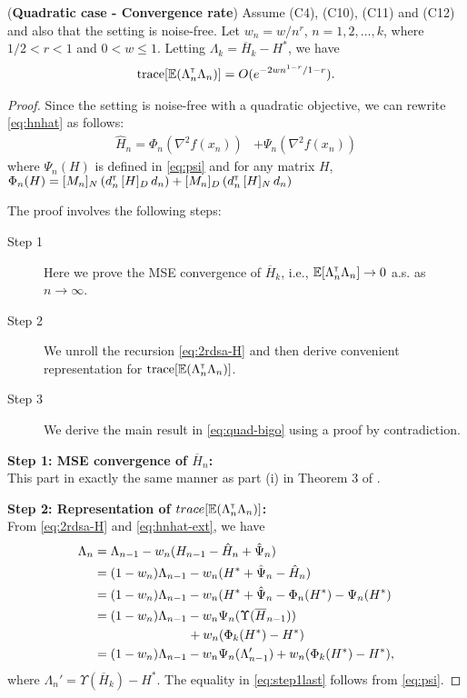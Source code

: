 \begin{theorem}(\textbf{Quadratic case - Convergence rate})
\label{thm:quad-bound}
Assume (C4), (C10), (C11) and (C12) and also that the setting is noise-free. 
Let $w_n = w/n^r$, $n=1,2,\ldots,k$, where $1/2 < r < 1$ and $0 < w \leq 1$. Letting $\Lambda_k = \overline H_k - H^*$, we have 
\begin{align}
\text{trace}[\mathbb{E} (\Lambda_n ^\mathsf{\scriptscriptstyle T} \Lambda_n)] = O(e^{-2wn^{1-r} / {1-r}}).
\label{eq:quad-bigo}
\end{align}
\end{theorem}
\begin{proof}
Since the setting is noise-free with a quadratic objective, we can rewrite \eqref{eq:hnhat} as follows:
\begin{align}
 \widehat H_n =    \Phi_n(\nabla^2 f(x_n)) &+\Psi_{n}(\nabla^2 f(x_n))\label{eq:hnhat-ext}
\end{align}
where $\Psi_n(H)$ is defined in \eqref{eq:psi} and for any matrix $H$, $\Phi_{n}(H) = [M_n]_{N}\left(d_{n}^\mathsf{\scriptscriptstyle T} \, [H]_{D} \, d_{n}\right) +  [M_n]_{D}\left(d_{n}^\mathsf{\scriptscriptstyle T} \, [H]_{N} \, d_{n}\right)$

The proof involves the following steps:
\begin{description}
  \item[Step 1] Here we prove the MSE convergence of $\overline H_k$, i.e., $\mathbb{E} [\Lambda_n^\mathsf{\scriptscriptstyle T} \Lambda_n] \rightarrow 0$ a.s. as $n\rightarrow \infty$.
  \item[Step 2] We unroll the recursion \eqref{eq:2rdsa-H} and then derive convenient representation for $\text{trace}[\mathbb{E} (\Lambda_n ^\mathsf{\scriptscriptstyle T} \Lambda_n)]$.
  \item[Step 3] We derive the main result in \eqref{eq:quad-bigo} using a proof by contradiction. 
\end{description}

\textbf{Step 1: MSE convergence of $\overline H_n$:} \\
This part in exactly the same manner as part (i) in Theorem 3 of \cite{spall-jacobian}.

\textbf{Step 2: Representation of $trace[\mathbb{E} (\Lambda_n ^\mathsf{\scriptscriptstyle T} \Lambda_n)]$:} \\
 From \eqref{eq:2rdsa-H} and \eqref{eq:hnhat-ext},  we have
 \begin{align}
 \Lambda_n &= \Lambda_{n-1} - w_n ( H_{n-1} - \hat H_n + \hat \Psi_n) \nonumber\\
&= (1-w_n) \Lambda_{n-1} - w_n (H^* + \hat \Psi_n - \hat H_n ) \nonumber\\&= (1-w_n) \Lambda_{n-1} - w_n (H^*+\hat \Psi_n -\Phi_n(H^*) - \Psi_n(H^*)\nonumber\\&= (1-w_n) \Lambda_{n-1} - w_n \Psi_n(\Upsilon(\overline H_{n-1})) \nonumber\\& \hspace{2.6cm}+ w_n (\Phi_k(H^*) - H^*)\nonumber\\
&= (1-w_n) \Lambda_{n-1} - w_n\Psi_n(\Lambda_{n-1}')+ w_n (\Phi_k(H^*) - H^*),\label{eq:step1last}
 \end{align}
where $\Lambda_n' = \Upsilon(\overline H_k) - H^*$.
The equality in \eqref{eq:step1last} follows from \eqref{eq:psi}. 


\end{proof}
